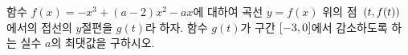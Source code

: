 함수 $f(x)=-x^3+(a-2)x^2-ax$에 대하여 곡선 $y=f(x)$ 위의 점~$(t{,}\mkern3mu\mathopen{}f(t))$에서의 접선의 $y$절편을 $g(t)$라 하자. 함수 $g(t)$가 구간 $[-3{,}\mkern3mu\mathopen{}0]$에서 감소하도록 하는 실수 $a$의 최댓값을 구하시오.
